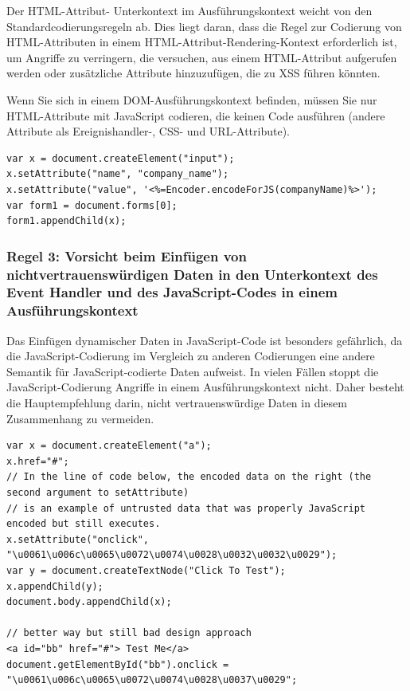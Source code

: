 Der HTML-Attribut- Unterkontext im Ausführungskontext weicht von den Standardcodierungsregeln ab. Dies liegt daran, dass die Regel zur Codierung von HTML-Attributen in einem HTML-Attribut-Rendering-Kontext erforderlich ist, um Angriffe zu verringern, die versuchen, aus einem HTML-Attribut aufgerufen werden oder zusätzliche Attribute hinzuzufügen, die zu XSS führen könnten.

Wenn Sie sich in einem DOM-Ausführungskontext befinden, müssen Sie nur HTML-Attribute mit JavaScript codieren, die keinen Code ausführen (andere Attribute als Ereignishandler-, CSS- und URL-Attribute).

\begin{lstlisting}[numbers=none, caption={Regel 2 - Beispiel JavaScript-Escape vor dem Einfügen in den HTML Attribute Unterkontext}, label=Beispiel JavaScript-Escape]
var x = document.createElement("input");
x.setAttribute("name", "company_name");
x.setAttribute("value", '<%=Encoder.encodeForJS(companyName)%>');
var form1 = document.forms[0];
form1.appendChild(x);
\end{lstlisting}

\subsubsection{Regel 3: Vorsicht beim Einfügen von nichtvertrauenswürdigen Daten in den Unterkontext des Event Handler und des JavaScript-Codes in einem Ausführungskontext}

Das Einfügen dynamischer Daten in JavaScript-Code ist besonders gefährlich, da die JavaScript-Codierung im Vergleich zu anderen Codierungen eine andere Semantik für JavaScript-codierte Daten aufweist. In vielen Fällen stoppt die JavaScript-Codierung Angriffe in einem Ausführungskontext nicht. Daher besteht die Hauptempfehlung darin, nicht vertrauenswürdige Daten in diesem Zusammenhang zu vermeiden.

\begin{lstlisting}[numbers=none, caption={Regel 3 - Beispiel JavaScript-Escape vor dem Einfügen in den HTML Attribute Unterkontext}, label=Beispiel Beispiel JavaScript-Escape im HTML Attribut Unterkontext]
var x = document.createElement("a");
x.href="#";
// In the line of code below, the encoded data on the right (the second argument to setAttribute)
// is an example of untrusted data that was properly JavaScript encoded but still executes.
x.setAttribute("onclick", "\u0061\u006c\u0065\u0072\u0074\u0028\u0032\u0032\u0029");
var y = document.createTextNode("Click To Test");
x.appendChild(y);
document.body.appendChild(x);

// better way but still bad design approach
<a id="bb" href="#"> Test Me</a>
document.getElementById("bb").onclick = "\u0061\u006c\u0065\u0072\u0074\u0028\u0037\u0029";
\end{lstlisting}


